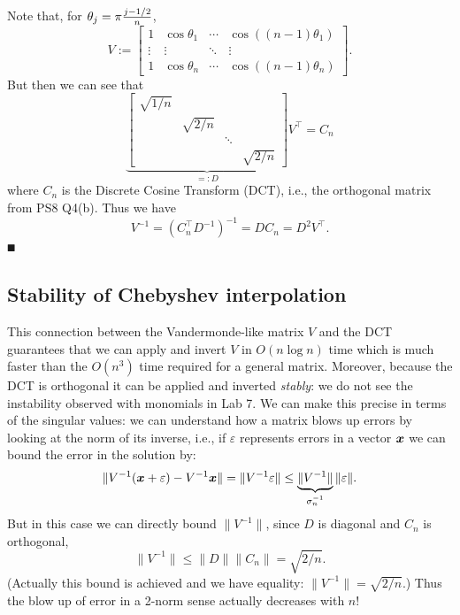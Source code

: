 Note that, for $\ensuremath{\theta}_j = \ensuremath{\pi}{j-1/2 \over n}$,
\[
V := \begin{bmatrix}
1 & \cos \ensuremath{\theta}_1 & \ensuremath{\cdots} & \cos((n-1)\ensuremath{\theta}_1) \\
\ensuremath{\vdots} & \ensuremath{\vdots} & \ensuremath{\ddots} & \ensuremath{\vdots} \\
1 & \cos \ensuremath{\theta}_n & \ensuremath{\cdots} & \cos((n-1)\ensuremath{\theta}_n)
\end{bmatrix}.
\]
But then we can see that
\[
\underbrace{\begin{bmatrix}
\sqrt{1/n} \\
 & \sqrt{2/n} \\
 && \ensuremath{\ddots} \\
 &&& \sqrt{2/n}
 \end{bmatrix}}_{=:D} V^\ensuremath{\top} = C_n
\]
where $C_n$ is the Discrete Cosine Transform (DCT), i.e., the orthogonal matrix from PS8 Q4(b). Thus we have
\[
V^{-1} = (C_n^\ensuremath{\top} D^{-1})^{-1} = D C_n = D^2 V^\ensuremath{\top}.
\]
\ensuremath{\QED}

\subsection{Stability of Chebyshev interpolation}
This connection between the Vandermonde-like matrix $V$ and the DCT guarantees that we can apply and invert $V$ in $O(n \log n)$ time which is much faster than the $O(n^3)$ time required for a general matrix. Moreover, because the DCT is orthogonal it can be applied and inverted \emph{stably}: we do not see the instability observed with monomials in Lab 7.  We can make this precise in terms of the singular values: we can understand how a matrix blows up errors by looking at the norm of its inverse, i.e., if $\ensuremath{\varepsilon}$ represents errors in a vector $\bm{{\mbox{\boldmath$x$\unboldmath}}}$ we can bound the error in the solution by:
\[
\| V^{-1}(\bm{{\mbox{\boldmath$x$\unboldmath}}} + \varepsilon) - V^{-1} \bm{{\mbox{\boldmath$x$\unboldmath}}}\| = \| V^{-1}\varepsilon\| \leq \underbrace{\|V^{-1}\|}_{\sigma_n^{-1}} \|\varepsilon\|.
\]
But in this case we can directly bound $\|V^{-1}\|$, since $D$ is diagonal and $C_n$ is orthogonal,
\[
\| V^{-1}\| \ensuremath{\leq} \| D \| \| C_n\| = \sqrt{2/n}.
\]
(Actually this bound is achieved and we have equality: $\| V^{-1}\| = \sqrt{2/n}$.) Thus the blow up of error in a 2-norm sense actually decreases with $n$!  

